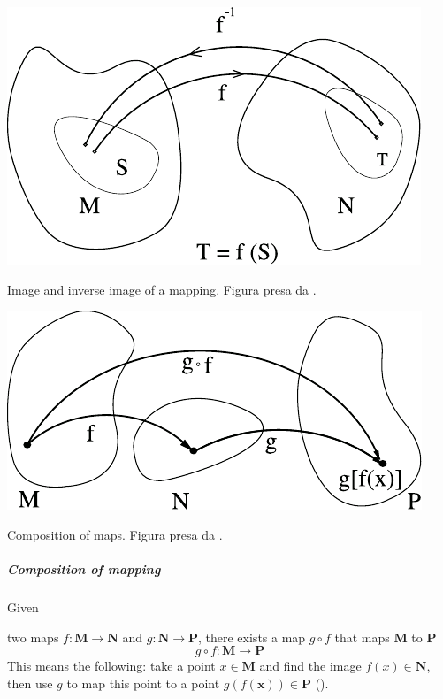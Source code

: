 \documentclass[../main.tex]{subfiles}
\begin{document}
\begin{marginfigure}[-80mm]
	\includegraphics{images/immagine_e_inversa_mappa.pdf}
	\caption[Image and inverse image of a mapping.
]{Image and inverse image of a mapping. Figura presa da \cite{ferrari2020general}.}
\end{marginfigure} 
\begin{marginfigure}[-40mm]
	\includegraphics{images/composizione_mappe.pdf}
	\caption[Composition of maps]{Composition of maps. Figura presa da \cite{ferrari2020general}.}
\end{marginfigure} 
\subparagraph{Composition of mapping}
\hypertarget{map-comp}{Given} two maps \(f : \mathbf{M} \to \mathbf{N}\) and \(g : \mathbf{N} \to \mathbf{P}\), there exists a map $g \circ f$ that maps $\mathbf{M}$ to $\mathbf{P}$
\[
g \circ f : \mathbf{M} \to \mathbf{P}
\]
This means the following: take a point $x \in \mathbf{M}$ and find the image $f(x) \in \mathbf{N}$, then use $g$ to map this point to a point $g(f(\mathbf{x})) \in \mathbf{P}$ ().
\end{document}
